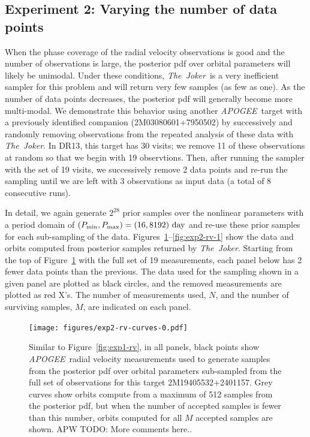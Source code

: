 \documentclass[manuscript, letterpaper]{aastex6}
\newcommand{\project}[1]{\textsl{#1}}
\newcommand{\acronym}[1]{{\small{#1}}}
\newcommand{\apogee}{\project{\acronym{APOGEE}}}
\newcommand{\samplername}{\project{The~Joker}}
\newcommand{\figname}{Figure}
\newcommand{\todoapw}[1]{{\color{red}APW TODO: #1}}
\begin{document}
\subsection{Experiment 2: Varying the number of data points}

When the phase coverage of the radial velocity observations is good and the
number of observations is large, the posterior pdf over orbital parameters will
likely be unimodal.
Under these conditions, \samplername\ is a very inefficient sampler for this
problem and will return very few samples (as few as one).
As the number of data points decreases, the posterior pdf will generally become
more multi-modal.
We demonstrate this behavior using another \apogee\ target with a previously
identified companion (2M03080601+7950502) by successively and randomly removing
observations from the repeated analysis of these data with \samplername.
In DR13, this target has 30 visits; we remove 11 of these observations at random
so that we begin with 19 observtions.
Then, after running the sampler with the set of 19 visits, we successively
remove 2 data points and re-run the sampling until we are left with 3
observations as input data (a total of 8 consecutive runs).

In detail, we again generate $2^{28}$ prior samples over the nonlinear
parameters with a period domain of $(P_{\rm min}, P_{\rm max}) = (16, 8192)~{\rm
day}$ and re-use these prior samples for each sub-sampling of the data.
\figname s~\ref{fig:exp2-rv-0}--\ref{fig:exp2-rv-1} show the data and orbits
computed from posterior samples returned by \samplername.
Starting from the top of \figname~\ref{fig:exp2-rv-0} with the full set of 19
measurements, each panel below has 2 fewer data points than the previous.
The data used for the sampling shown in a given panel are plotted as black
circles, and the removed measurements are plotted as red X's.
The number of measurements used, $N$, and the number of surviving samples, $M$,
are indicated on each panel.

\begin{figure}[p]
\begin{center}
\texttt{[image: figures/exp2-rv-curves-0.pdf]}
\end{center}
\caption{%
Similar to \figname~\ref{fig:exp1-rv}, in all panels, black points show
\apogee\ radial velocity measurements used to generate samples from the
posterior pdf over orbital parameters sub-sampled from the full set of
observations for this target 2M19405532+2401157.
Grey curves show orbits compute from a maximum of 512 samples from the
posterior pdf, but when the number of accepted samples is fewer than this
number, orbits computed for all $M$ accepted samples are shown.
\todoapw{More comments here..}
\label{fig:exp2-rv-0}}
\end{figure}
\end{document}
